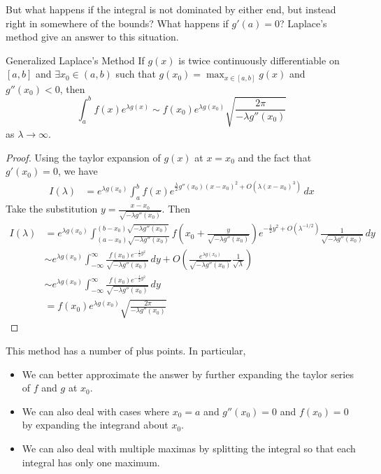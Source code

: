 \documentclass[a4paper]{article}
\begin{document}
But what happens if the integral is not dominated by either end, but instead right in somewhere of the bounds? What happens if $g'(a)=0$? Laplace's method give an answer to this situation. 

\begin{prp}{Generalized Laplace's Method}{} If $g(x)$ is twice continuously differentiable on $[a,b]$ and $\exists x_0\in(a,b)$ such that $g(x_0)=\max_{x\in[a,b]}g(x)$ and $g''(x_0)<0$, then $$\int_a^bf(x)e^{\lambda g(x)}\sim f(x_0)e^{\lambda g(x_0)}\sqrt{\frac{2\pi}{-\lambda g''(x_0)}}$$ as $\lambda\to\infty$. \tcbline
\begin{proof}
Using the taylor expansion of $g(x)$ at $x=x_0$ and the fact that $g'(x_0)=0$, we have
\begin{align*}
I(\lambda)&=e^{\lambda g(x_0)}\int_a^bf(x)e^{\frac{\lambda}{2}g''(x_0)(x-x_0)^2+O(\lambda(x-x_0)^3)}\,dx
\end{align*}
Take the substitution $y=\frac{x-x_0}{\sqrt{-\lambda g''(x_0)}}$. Then
\begin{align*}
I(\lambda)&=e^{\lambda g(x_0)}\int_{(a-x_0)\sqrt{-\lambda g''(x_0)}}^{(b-x_0)\sqrt{-\lambda g''(x_0)}}f\left(x_0+\frac{y}{\sqrt{-\lambda g''(x_0)}}\right)e^{-\frac{1}{2}y^2+O(\lambda^{-1/2})}\frac{1}{\sqrt{-\lambda g''(x_0)}}\,dy\\
&\sim e^{\lambda g(x_0)}\int_{-\infty}^\infty \frac{f(x_0)e^{-\frac{1}{2}y^2}}{\sqrt{-\lambda g''(x_0)}}\,dy+O\left(\frac{e^{\lambda g(x_0)}}{\sqrt{-\lambda g''(x_0)}}\frac{1}{\sqrt{\lambda}}\right)\tag{as $\lambda\to\infty$, and taylor of $f$}\\
&\sim e^{\lambda g(x_0)}\int_{-\infty}^\infty \frac{f(x_0)e^{-\frac{1}{2}y^2}}{\sqrt{-\lambda g''(x_0)}}\,dy\tag{as $\lambda\to\infty$}\\
&=f(x_0)e^{\lambda g(x_0)}\sqrt{\frac{2\pi}{-\lambda g''(x_0)}}
\end{align*}
\end{proof}
\end{prp}

This method has a number of plus points. In particular, 
\begin{itemize}
\item We can better approximate the answer by further expanding the taylor series of $f$ and $g$ at $x_0$. 
\item We can also deal with cases where $x_0=a$ and $g''(x_0)=0$ and $f(x_0)=0$ by expanding the integrand about $x_0$. 
\item We can also deal with multiple maximas by splitting the integral so that each integral has only one maximum. 
\end{itemize}
\end{document}
